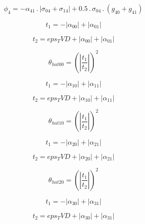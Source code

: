 \documentclass{article}
\begin{document}
\begin{dmath}\phi_{4} = - \alpha_{41} \,.\, \left|{\sigma_{0 4} + \sigma_{1 4}}\right| + 0.5 \,.\, \sigma_{0 4} \,.\, \left(g_{40} + g_{41}\right)\end{dmath}

\begin{dmath}t_{1} = - \left|{\alpha_{00}}\right| + \left|{\alpha_{01}}\right|\end{dmath}

\begin{dmath}t_{2} = eps_TVD + \left|{\alpha_{00}}\right| + \left|{\alpha_{01}}\right|\end{dmath}

\begin{dmath}\theta_{hat 00} = \left(\left|{\frac{t_{1}}{t_{2}}}\right| \right)^{2}\end{dmath}

\begin{dmath}t_{1} = - \left|{\alpha_{10}}\right| + \left|{\alpha_{11}}\right|\end{dmath}

\begin{dmath}t_{2} = eps_TVD + \left|{\alpha_{10}}\right| + \left|{\alpha_{11}}\right|\end{dmath}

\begin{dmath}\theta_{hat 10} = \left(\left|{\frac{t_{1}}{t_{2}}}\right| \right)^{2}\end{dmath}

\begin{dmath}t_{1} = - \left|{\alpha_{20}}\right| + \left|{\alpha_{21}}\right|\end{dmath}

\begin{dmath}t_{2} = eps_TVD + \left|{\alpha_{20}}\right| + \left|{\alpha_{21}}\right|\end{dmath}

\begin{dmath}\theta_{hat 20} = \left(\left|{\frac{t_{1}}{t_{2}}}\right| \right)^{2}\end{dmath}

\begin{dmath}t_{1} = - \left|{\alpha_{30}}\right| + \left|{\alpha_{31}}\right|\end{dmath}

\begin{dmath}t_{2} = eps_TVD + \left|{\alpha_{30}}\right| + \left|{\alpha_{31}}\right|\end{dmath}
\end{document}
